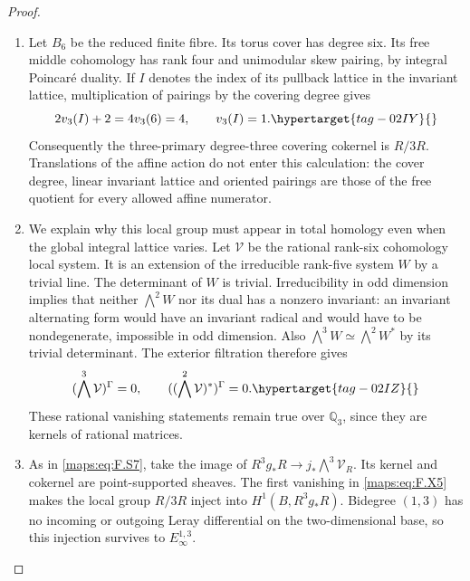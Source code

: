 \documentclass[11pt,a4paper]{article}
\numberwithin{equation}{section}
\theoremstyle{definition}
\begin{document}
\begin{proof}
\begin{enumerate}[label=\arabic*.]
\item Let $B_6$ be the reduced finite fibre.  Its torus
cover has degree six.  Its free middle cohomology has
rank four and unimodular skew pairing, by integral
Poincar\'e duality.  If $I$ denotes the index of its
pullback lattice in the invariant lattice, multiplication
of pairings by the covering degree gives
\begin{equation}
 2v_3(I)+2=4v_3(6)=4,
 \qquad v_3(I)=1.
 \hypertarget{tag-02IY}{}\label{maps:eq:F.X4}
\end{equation}
Consequently the three-primary degree-three covering
cokernel is $R/3R$.  Translations of the affine action
do not enter this calculation: the cover degree,
linear invariant lattice and oriented pairings are
those of the free quotient for every allowed
affine numerator.

\item We explain why this local group must appear in total
homology even when the global integral lattice varies.
Let $\mathcal V$ be the rational rank-six cohomology
local system.  It is an extension of the irreducible
rank-five system $W$ by a trivial line.  The determinant
of $W$ is trivial.  Irreducibility in odd dimension
implies that neither $\bigwedge^2 W$ nor its dual
has a nonzero invariant: an invariant alternating
form would have an invariant radical and would have
to be nondegenerate, impossible in odd dimension.
Also $\bigwedge^3W\simeq\bigwedge^2W^*$ by its
trivial determinant.  The exterior filtration therefore
gives
\begin{equation}
 (\bigwedge^3\mathcal V)^\Gamma=0,\qquad
 ((\bigwedge^2\mathcal V)^*)^\Gamma=0.
 \hypertarget{tag-02IZ}{}\label{maps:eq:F.X5}
\end{equation}
These rational vanishing statements remain true over
$\mathbb Q_3$, since they are kernels of rational
matrices.

\item As in \eqref{maps:eq:F.S7}, take the image of
$R^3g_*R\to j_*\bigwedge^3\mathcal V_R$.
Its kernel and cokernel are point-supported sheaves.
The first vanishing in \eqref{maps:eq:F.X5} makes the local group
$R/3R$ inject into $H^1(B,R^3g_*R)$.  Bidegree $(1,3)$
has no incoming or outgoing Leray differential on
the two-dimensional base, so this injection survives
to $E_\infty^{1,3}$.


\end{enumerate}
\end{proof}
\end{document}
